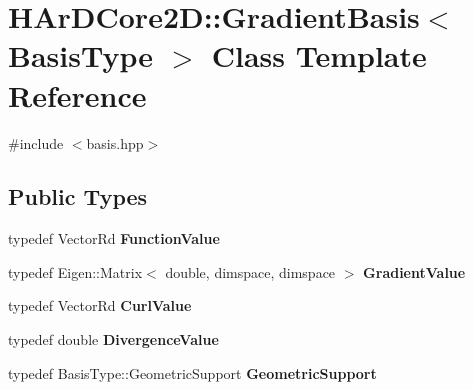 \hypertarget{classHArDCore2D_1_1GradientBasis}{}\section{H\+Ar\+D\+Core2D\+:\+:Gradient\+Basis$<$ Basis\+Type $>$ Class Template Reference}
\label{classHArDCore2D_1_1GradientBasis}


{\ttfamily \#include $<$basis.\+hpp$>$}

\subsection*{Public Types}
\begin{DoxyCompactItemize}
\item 
\mbox{\label{classHArDCore2D_1_1GradientBasis_a88eba0d5ce79a279b6577d119c88442a}} 
typedef Vector\+Rd {\bfseries Function\+Value}
\item 
\mbox{\label{classHArDCore2D_1_1GradientBasis_a5ebfddada3978c4b571e667b939496c6}} 
typedef Eigen\+::\+Matrix$<$ double, dimspace, dimspace $>$ {\bfseries Gradient\+Value}
\item 
\mbox{\label{classHArDCore2D_1_1GradientBasis_ac2c823452962577abcb6f9176f1554fe}} 
typedef Vector\+Rd {\bfseries Curl\+Value}
\item 
\mbox{\label{classHArDCore2D_1_1GradientBasis_a639a17eae62656583350d42bba42773c}} 
typedef double {\bfseries Divergence\+Value}
\item 
\mbox{\label{classHArDCore2D_1_1GradientBasis_ad7aeabadc1694d72f9a7ec37924b86b7}} 
typedef Basis\+Type\+::\+Geometric\+Support {\bfseries Geometric\+Support}
\end{DoxyCompactItemize}
